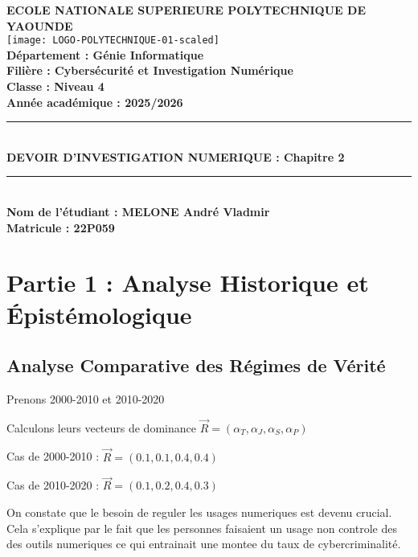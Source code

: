 \documentclass[11pt,a4paper]{article}
\begin{document}
\begin{titlepage}
    \centering
    {\Large \textbf{ECOLE NATIONALE SUPERIEURE POLYTECHNIQUE DE YAOUNDE}}\\[1.5cm]

    \texttt{[image: LOGO-POLYTECHNIQUE-01-scaled]} \\[1.5cm] 

    {\Large \textbf{Département : Génie Informatique}}\\[0.3cm]
    {\Large \textbf{Filière : Cybersécurité et Investigation Numérique}}\\[0.3cm]
    {\Large \textbf{Classe : Niveau 4}}\\[0.3cm]
    {\Large \textbf{Année académique : 2025/2026}}\\[2cm]

    \rule{\linewidth}{0.5mm} \\[0.4cm]
    {\huge \textbf{DEVOIR D'INVESTIGATION NUMERIQUE : Chapitre 2}}\\[0.4cm]
    \rule{\linewidth}{0.5mm} \\[3cm]

    \hfill \textbf{Nom de l'étudiant : MELONE André Vladmir } \\[1.5cm]
	\hfill \textbf{Matricule : 22P059 } \\[1.5cm]

    \vfill
\end{titlepage}

\tableofcontents
\newpage

\section{Partie 1 : Analyse Historique et Épistémologique}

\subsection{Analyse Comparative des Régimes de Vérité}

Prenons 2000-2010 et 2010-2020 

Calculons leurs vecteurs de dominance $\vec{R} = (\alpha_T, \alpha_J, \alpha_S, \alpha_P)$

\item Cas de 2000-2010 : $\vec{R} = (0.1, 0.1, 0.4, 0.4)$
\item Cas de 2010-2020 : $\vec{R} = (0.1, 0.2, 0.4, 0.3)$

On constate que le besoin de reguler les usages numeriques est devenu crucial. Cela s'explique par le fait que les personnes faisaient un usage non controle des des outils numeriques ce qui entrainait une montee du taux de cybercriminalité.
\end{document}
